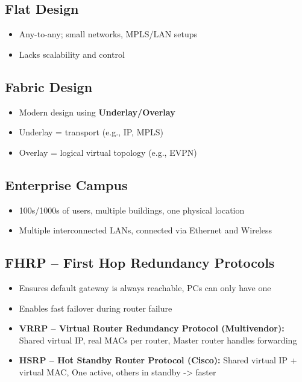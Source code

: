 \begin{multicols*}{5}
		\subsection{Flat Design}
		\begin{itemize}
			\item Any-to-any; small networks, MPLS/LAN setups
			\item Lacks scalability and control
		\end{itemize}
		
		\subsection{Fabric Design}
		\begin{itemize}
			\item Modern design using \textbf{Underlay/Overlay}
			\item Underlay = transport (e.g., IP, MPLS)
			\item Overlay = logical virtual topology (e.g., EVPN)
		\end{itemize}
		
		\subsection{Enterprise Campus}
		\begin{itemize}
			\item 100s/1000s of users, multiple buildings, one physical location
			\item Multiple interconnected LANs, connected via Ethernet and Wireless
		\end{itemize}
		
		\subsection{FHRP – First Hop Redundancy Protocols}
		\begin{itemize}
			\item Ensures default gateway is always reachable, PCs can only have one
			\item Enables fast failover during router failure
			
			\item \textbf{VRRP – Virtual Router Redundancy Protocol (Multivendor):} Shared virtual IP, real MACs per router, Master router handles forwarding
			
			\item \textbf{HSRP – Hot Standby Router Protocol (Cisco):} Shared virtual IP + virtual MAC, One active, others in standby -> faster
			

\end{itemize}
\end{multicols*}
